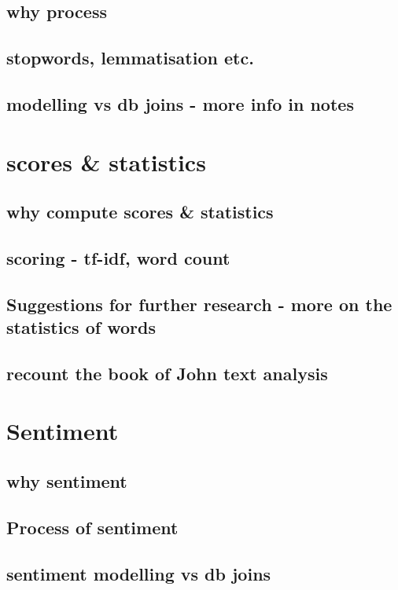 \documentclass[11pt, a4paper, oneside]{report}
\begin{document}
\subsection{why process}
\subsection{stopwords, lemmatisation etc.}
\subsection{modelling vs db joins - more info in notes}

\section{scores \& statistics}
\label{sec:statistics}

\subsection{why compute scores \& statistics}
\subsection{scoring - tf-idf, word count}
\subsection{Suggestions for further research - more on the statistics of words}
\subsection{recount the book of John text analysis}

\section{Sentiment}
\label{sec:sentiment}

\subsection{why sentiment}
\subsection{Process of sentiment}
\subsection{sentiment modelling vs db joins}
\end{document}
